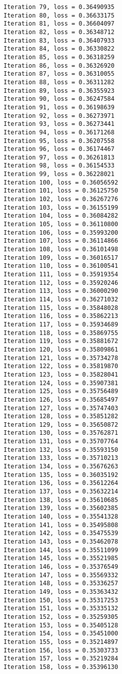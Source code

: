 \documentclass[11pt]{article}
\begin{document}
\begin{Verbatim}[commandchars=\\\{\}]
Iteration 79, loss = 0.36490935
Iteration 80, loss = 0.36633175
Iteration 81, loss = 0.36604097
Iteration 82, loss = 0.36348712
Iteration 83, loss = 0.36407933
Iteration 84, loss = 0.36330822
Iteration 85, loss = 0.36318259
Iteration 86, loss = 0.36326920
Iteration 87, loss = 0.36310055
Iteration 88, loss = 0.36311282
Iteration 89, loss = 0.36355923
Iteration 90, loss = 0.36247584
Iteration 91, loss = 0.36198639
Iteration 92, loss = 0.36273971
Iteration 93, loss = 0.36273441
Iteration 94, loss = 0.36171268
Iteration 95, loss = 0.36207558
Iteration 96, loss = 0.36174467
Iteration 97, loss = 0.36261813
Iteration 98, loss = 0.36154533
Iteration 99, loss = 0.36228021
Iteration 100, loss = 0.36056592
Iteration 101, loss = 0.36125750
Iteration 102, loss = 0.36267276
Iteration 103, loss = 0.36155199
Iteration 104, loss = 0.36084282
Iteration 105, loss = 0.36110800
Iteration 106, loss = 0.35993200
Iteration 107, loss = 0.36114866
Iteration 108, loss = 0.36101498
Iteration 109, loss = 0.36016517
Iteration 110, loss = 0.36100541
Iteration 111, loss = 0.35919354
Iteration 112, loss = 0.35920246
Iteration 113, loss = 0.36000290
Iteration 114, loss = 0.36271032
Iteration 115, loss = 0.35848028
Iteration 116, loss = 0.35862213
Iteration 117, loss = 0.35934689
Iteration 118, loss = 0.35869755
Iteration 119, loss = 0.35881672
Iteration 120, loss = 0.35809861
Iteration 121, loss = 0.35734278
Iteration 122, loss = 0.35819870
Iteration 123, loss = 0.35828041
Iteration 124, loss = 0.35907381
Iteration 125, loss = 0.35756489
Iteration 126, loss = 0.35685497
Iteration 127, loss = 0.35747403
Iteration 128, loss = 0.35851282
Iteration 129, loss = 0.35650872
Iteration 130, loss = 0.35762871
Iteration 131, loss = 0.35707764
Iteration 132, loss = 0.35593150
Iteration 133, loss = 0.35710213
Iteration 134, loss = 0.35676263
Iteration 135, loss = 0.36035192
Iteration 136, loss = 0.35612264
Iteration 137, loss = 0.35632214
Iteration 138, loss = 0.35610685
Iteration 139, loss = 0.35602385
Iteration 140, loss = 0.35541328
Iteration 141, loss = 0.35495808
Iteration 142, loss = 0.35475539
Iteration 143, loss = 0.35462078
Iteration 144, loss = 0.35511099
Iteration 145, loss = 0.35521985
Iteration 146, loss = 0.35376549
Iteration 147, loss = 0.35569332
Iteration 148, loss = 0.35336257
Iteration 149, loss = 0.35363432
Iteration 150, loss = 0.35317253
Iteration 151, loss = 0.35335132
Iteration 152, loss = 0.35259305
Iteration 153, loss = 0.35405128
Iteration 154, loss = 0.35451000
Iteration 155, loss = 0.35214897
Iteration 156, loss = 0.35303733
Iteration 157, loss = 0.35219284
Iteration 158, loss = 0.35396130

\end{Verbatim}
\end{document}
